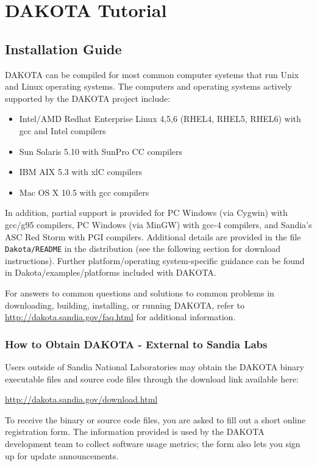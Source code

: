 \chapter{DAKOTA Tutorial}\label{tutorial}

\section{Installation Guide}\label{tutorial:installation}

DAKOTA can be compiled for most common computer systems that run Unix
and Linux operating systems. The computers and operating systems
actively supported by the DAKOTA project include:

\begin{itemize}
\item Intel/AMD Redhat Enterprise Linux 4,5,6 (RHEL4, RHEL5, RHEL6) with gcc and Intel compilers
\item Sun Solaris 5.10 with SunPro CC compilers
\item IBM AIX 5.3 with xlC compilers
\item Mac OS X 10.5 with gcc compilers
\end{itemize}

In addition, partial support is provided for PC Windows (via Cygwin)
with gcc/g95 compilers, PC Windows (via MinGW) with gcc-4 compilers,
and Sandia's ASC Red Storm with PGI compilers. Additional details are
provided in the file \texttt{Dakota/README} in the distribution (see
the following section for download instructions).  Further
platform/operating system-specific guidance can be found in
Dakota/examples/platforms included with DAKOTA.

For answers to common questions and solutions to common problems in
downloading, building, installing, or running DAKOTA, refer to
\url{http://dakota.sandia.gov/faq.html} for additional information.

\subsection{How to Obtain DAKOTA - External to Sandia Labs}\label{tutorial:installation:how1}

Users outside of Sandia National Laboratories may obtain the DAKOTA
binary executable files and source code files through the download
link available here:\smallskip

\url{http://dakota.sandia.gov/download.html}

To receive the binary or source code files, you are asked to fill out
a short online registration form. The information provided is used by
the DAKOTA development team to collect software usage metrics; the
form also lets you sign up for update announcements.

